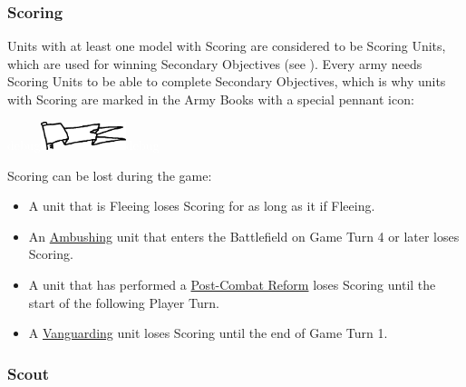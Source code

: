 \subsubsection{Scoring}
\label{scoring}

Units with at least one model with Scoring are considered to be Scoring Units, which are used for winning Secondary Objectives (see ). Every army needs Scoring Units to be able to complete Secondary Objectives, which is why units with Scoring are marked in the Army Books with a special pennant icon:

\begin{center}
\textcolor{white}{debug}\includegraphics[width=2.5cm]{../Layout/pics/logo_scoring.png}\textcolor{white}{debug}
\end{center}


Scoring can be lost during the game:
\begin{itemize}[label={-}]
\item A unit that is Fleeing loses Scoring for as long as it if Fleeing. 
\item An \hyperref[ambush]{Ambushing} unit that enters the Battlefield on Game Turn 4 or later loses Scoring.
\item A unit that has performed a \hyperref[post_combat_reform]{Post-Combat Reform} loses Scoring until the start of the following Player Turn.
\item A \hyperref[vanguard]{Vanguarding} unit loses Scoring until the end of Game Turn 1.
\end{itemize}

\subsubsection{Scout}
\label{scout}


